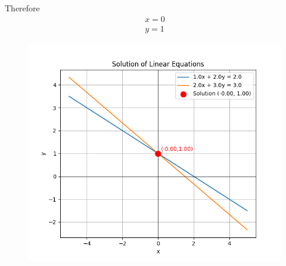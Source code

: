\documentclass[journal]{IEEEtran}
\begin{document}
Therefore
\begin{align}
x = 0 \\
y = 1
\end{align}
\begin{figure}[H]
    \centering
    \includegraphics[width=0.8\columnwidth]{figs/fig1.png}
    \caption{}
    \label{fig:1}
\end{figure}
\end{document}
